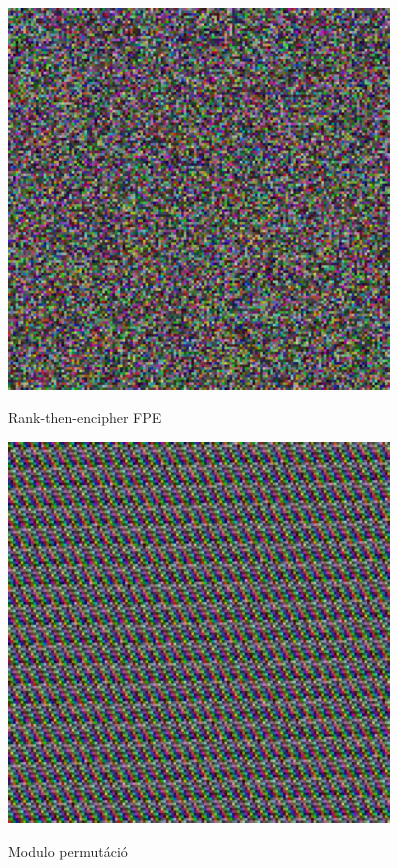 \documentclass[
    parspace,
    noindent,
    nohyp,
]{elteiktdk}[2023/04/10]
\begin{document}
\begin{figure}[H]
  \centering
  \hspace*{\fill}
  \begin{minipage}[b]{0.45\textwidth}
    \centering
    \includegraphics[width=0.9\textwidth]{image/permutation-fpe1.png}
    \par Rank-then-encipher FPE\protect\cite{Bellare2009FormatPreservingE}
  \end{minipage}
  \hspace*{\fill}
  \begin{minipage}[b]{0.45\textwidth}
    \centering
    \includegraphics[width=0.9\textwidth]{image/permutation-mp1.png}
    \par Modulo permutáció
  \end{minipage}
  \hspace*{\fill}


\end{figure}
\end{document}

